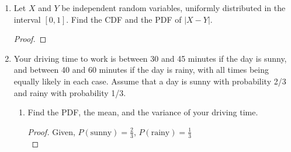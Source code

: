 \documentclass[paper=usletter, fontsize=12pt]{article}
\begin{document}
\begin{enumerate}
\begin{enumerate}
\begin{proof}
            \end{proof}

        \end{enumerate}

        \item Let $X$ and $Y$ be independent random variables, uniformly
        distributed in the interval $[0,1]$. Find the CDF and the PDF of
        $|X-Y|$.
        \begin{proof}
        \end{proof}

        \item Your driving time to work is between 30 and 45 minutes if the day
        is sunny, and between 40 and 60 minutes if the day is rainy, with all
        times being equally likely in each case. Assume that a day is sunny
        with probability 2/3 and rainy with probability 1/3.
        \begin{enumerate}

            \item Find the PDF, the mean, and the variance of your driving
            time.
            \begin{proof}

                Given, $P(\text{sunny}) = \frac{2}{3}$, $P(\text{rainy}) =
                \frac{1}{3}$\\


\end{proof}
\end{enumerate}
\end{enumerate}
\end{document}
